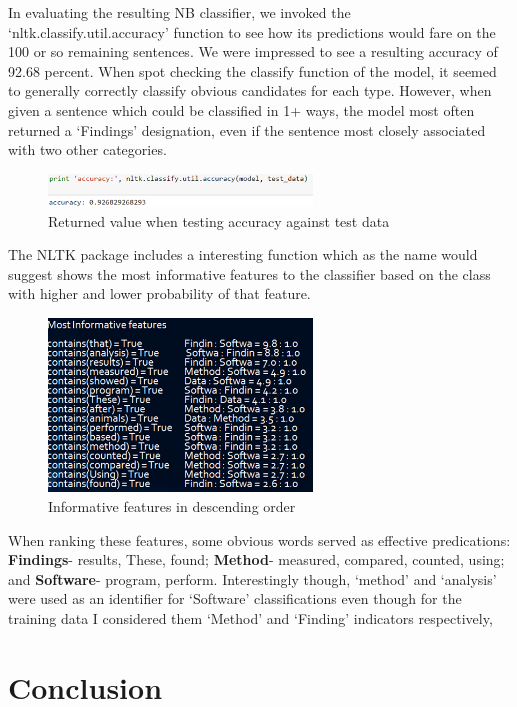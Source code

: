 \documentclass{article} %
\begin{document}
In evaluating the resulting NB classifier, we invoked the ‘nltk.classify.util.accuracy’ function to see how its predictions would fare on the 100 or so remaining sentences. We were impressed to see a resulting accuracy of 92.68 percent. When spot checking the classify function of the model, it seemed to generally correctly classify obvious candidates for each type. However, when given a sentence which could be classified in 1+ ways, the model most often returned a ‘Findings’ designation, even if the sentence most closely associated with two other categories.

\begin{figure}[h!]
\centering
\includegraphics[width=70mm]{Screenshot_120.png}
\caption{Returned value when testing accuracy against test data}
\end{figure}

The NLTK package includes a interesting function which as the name would suggest shows the most informative features to the classifier based on the class with higher and lower probability of that feature.
 
\begin{figure}[h!]
\centering
\includegraphics[width=70mm]{Screenshot_119.png}
\caption{Informative features in descending order}
\end{figure}

When ranking these features, some obvious words served as effective predications: {\bf Findings}- results, These, found; {\bf Method}- measured, compared, counted, using; and {\bf Software}- program, perform. Interestingly though, ‘method’ and ‘analysis’ were used as an identifier for ‘Software’ classifications even though for the training data I considered them  ‘Method’ and ‘Finding’ indicators respectively,

\section{Conclusion}
\end{document}
